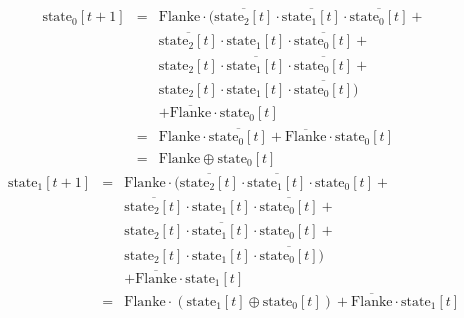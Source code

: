 \documentclass[DIN, pagenumber=false, fontsize=11pt, parskip=half]{scrartcl}
\begin{document}
\begin{enumerate}[label=(\alph*)]
\begin{eqnarray*}
                \text{state}_0[t+1] &=& \text{Flanke} \cdot (\overline{\text{state}_2[t]} \cdot \overline{\text{state}_1[t]} \cdot \overline{\text{state}_0[t]} + \\
                            && \overline{\text{state}_2[t]} \cdot \text{state}_1[t] \cdot \overline{\text{state}_0[t]} + \\
                            && \text{state}_2[t] \cdot \overline{\text{state}_1[t]} \cdot \overline{\text{state}_0[t]} + \\
                            && \text{state}_2[t] \cdot \text{state}_1[t] \cdot \overline{\text{state}_0[t]}) \\
                            && + \overline{\text{Flanke}} \cdot \text{state}_0[t]\\
                            &=& \text{Flanke} \cdot \overline{\text{state}_0[t]} +\overline{\text{Flanke}} \cdot \text{state}_0[t] \\
                            &=& \text{Flanke} \oplus \text{state}_0[t]
            \end{eqnarray*}
            \begin{eqnarray*}
                \text{state}_1[t+1] &=& \text{Flanke} \cdot (\overline{\text{state}_2[t]} \cdot \overline{\text{state}_1[t]} \cdot \text{state}_0[t] + \\
                            && \overline{\text{state}_2[t]} \cdot \text{state}_1[t] \cdot \overline{\text{state}_0[t]} +\\
                            && \text{state}_2[t] \cdot \overline{\text{state}_1[t]} \cdot \text{state}_0[t] +\\
                            && \text{state}_2[t] \cdot \text{state}_1[t] \cdot \overline{\text{state}_0[t]}) \\
                            && + \overline{\text{Flanke}} \cdot \text{state}_1[t] \\
                            &=& \text{Flanke} \cdot (\text{state}_1[t] \oplus \text{state}_0[t]) + \overline{\text{Flanke}} \cdot \text{state}_1[t]
            \end{eqnarray*}


\end{enumerate}
\end{document}
